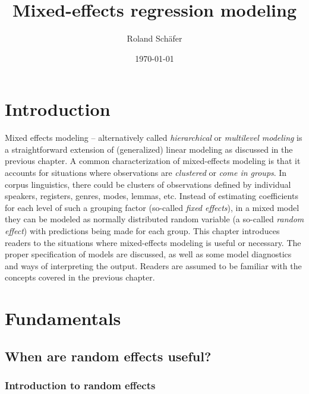 \documentclass[a4paper,12pt]{article}
\title{Mixed-effects regression modeling}
\author{Roland Schäfer}
\affil{Freie Universität Berlin}
\date{\today}
\begin{document}
       

\maketitle

\section{Introduction}
\label{sec:introduction}

Mixed effects modeling -- alternatively called \textit{hierarchical} or \textit{multilevel modeling} is a straightforward extension of (generalized) linear modeling as discussed in the previous chapter.
A common characterization of mixed-effects modeling is that it accounts for situations where observations are \textit{clustered} or \textit{come in groups}.
In corpus linguistics, there could be clusters of observations defined by individual speakers, registers, genres, modes, lemmas, etc.
Instead of estimating coefficients for each level of such a grouping factor (so-called \textit{fixed effects}), in a mixed model they can be modeled as normally distributed random variable (a so-called \textit{random effect}) with predictions being made for each group.
This chapter introduces readers to the situations where mixed-effects modeling is useful or necessary.
The proper specification of models are discussed, as well as some model diagnostics and ways of interpreting the output.
Readers are assumed to be familiar with the concepts covered in the previous chapter.

\section{Fundamentals}
\label{sec:fundamentals}

\subsection{When are random effects useful?}
\label{sec:whenrandomeffectsareuseful}

\subsubsection{Introduction to random effects}
\label{sec:introductiontorandomeffects}
\end{document}
